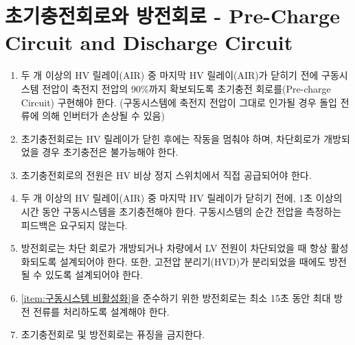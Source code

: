 \documentclass[final,a4paper,10pt]{report}
\begin{document}

\section{초기충전회로와 방전회로 - Pre-Charge Circuit and Discharge Circuit}\label{rule:formula-technical.precharge-discharge-circuits}
\begin{enumerate}
  \item\label{rule:formula-technical.precharge-discharge-circuits.precharge-target-90pct} 두 개 이상의 HV 릴레이(AIR) 중 마지막 HV 릴레이(AIR)가 닫히기 전에 구동시스템 전압이 축전지 전압의 90\%까지 확보되도록 초기충전 회로를(Pre-charge Circuit) 구현해야 한다. (구동시스템에 축전지 전압이 그대로 인가될 경우 돌입 전류에 의해 인버터가 손상될 수 있음)
  \item\label{rule:formula-technical.precharge-discharge-circuits.precharge-stop-and-disable} 초기충전회로는 HV 릴레이가 닫힌 후에는 작동을 멈춰야 하며, 차단회로가 개방되었을 경우 초기충전은 불가능해야 한다.
  \item\label{rule:formula-technical.precharge-discharge-circuits.precharge-power-hv-switch} 초기충전회로의 전원은 HV 비상 정지 스위치에서 직접 공급되어야 한다.
  \item\label{rule:formula-technical.precharge-discharge-circuits.precharge-min-duration-1s} 두 개 이상의 HV 릴레이(AIR) 중 마지막 HV 릴레이가 닫히기 전에, 1초 이상의 시간 동안 구동시스템을 초기충전해야 한다. 구동시스템의 순간 전압을 측정하는 피드백은 요구되지 않는다.
  \item\label{rule:formula-technical.precharge-discharge-circuits.discharge-activation-conditions} 방전회로는 차단 회로가 개방되거나 차량에서 LV 전원이 차단되었을 때 항상 활성화되도록 설계되어야 한다. 또한, 고전압 분리기(HVD)가 분리되었을 때에도 방전될 수 있도록 설계되어야 한다.
  \item\label{rule:formula-technical.precharge-discharge-circuits.discharge-min-duration-15s} \ref{item:구동시스템 비활성화}을 준수하기 위한 방전회로는 최소 15초 동안 최대 방전 전류를 처리하도록 설계해야 한다.
  \item\label{rule:formula-technical.precharge-discharge-circuits.no-fusing} 초기충전회로 및 방전회로는 퓨징을 금지한다.
\end{enumerate}
\end{document}
